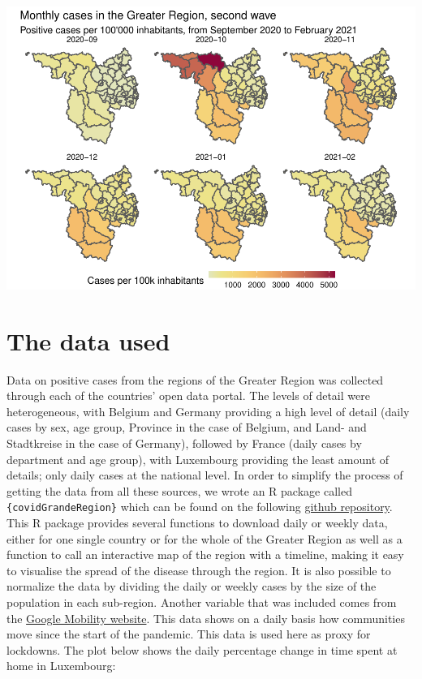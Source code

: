 \documentclass{article}
\newenvironment{Shaded}{\begin{snugshade}}{\end{snugshade}}
\newcommand{\FunctionTok}[1]{\textcolor[rgb]{0.00,0.00,0.00}{#1}}
\newcommand{\NormalTok}[1]{#1}
\newcommand{\SpecialCharTok}[1]{\textcolor[rgb]{0.00,0.00,0.00}{#1}}
\begin{document}
\begin{Shaded}
\end{Shaded}

\includegraphics[width=1\linewidth]{paper_files/figure-latex/unnamed-chunk-3-1}

\hypertarget{the-data-used}{%
\section{The data used}\label{the-data-used}}

Data on positive cases from the regions of the Greater Region was
collected through each of the countries' open data portal. The levels of
detail were heterogeneous, with Belgium and Germany providing a high
level of detail (daily cases by sex, age group, Province in the case of
Belgium, and Land- and Stadtkreise in the case of Germany), followed by
France (daily cases by department and age group), with Luxembourg
providing the least amount of details; only daily cases at the national
level. In order to simplify the process of getting the data from all
these sources, we wrote an R package called
\texttt{\{covidGrandeRegion\}} which can be found on the following
\href{https://github.com/b-rodrigues/covidGrandeRegion}{github
repository}. This R package provides several functions to download daily
or weekly data, either for one single country or for the whole of the
Greater Region as well as a function to call an interactive map of the
region with a timeline, making it easy to visualise the spread of the
disease through the region. It is also possible to normalize the data by
dividing the daily or weekly cases by the size of the population in each
sub-region. Another variable that was included comes from the
\href{https://www.google.com/covid19/mobility/}{Google Mobility
website}. This data shows on a daily basis how communities move since
the start of the pandemic. This data is used here as proxy for
lockdowns. The plot below shows the daily percentage change in time
spent at home in Luxembourg:
\end{document}
